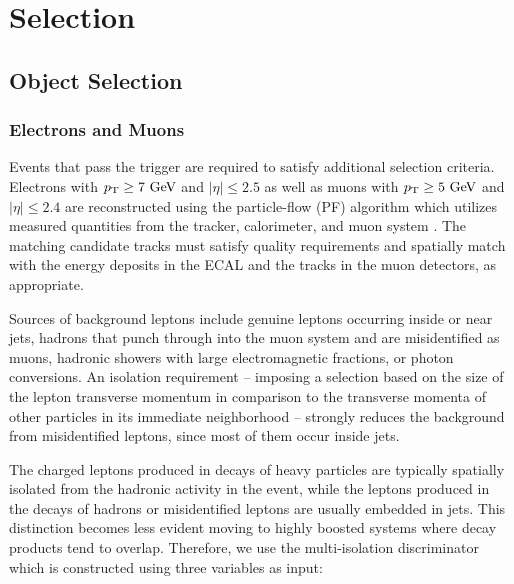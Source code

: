 \chapter{Selection}
\label{chap:Selection}

\section{Object Selection}
\label{sec:Selection/Object}

\subsection{Electrons and Muons}
Events that pass the trigger are required to satisfy additional selection criteria. Electrons with $p_{\mathrm{T}} \geq 7\,\,\text{Ge\hspace{-.08em}V}$ and $|\eta| \leq 2.5$ as well as muons with $p_{\mathrm{T}} \geq 5\,\,\text{Ge\hspace{-.08em}V}$ and $|\eta| \leq 2.4$ are reconstructed using the particle-flow (PF) algorithm which utilizes measured quantities from the tracker, calorimeter, and muon system \cite{CMS-PAS-PFT-09-001}. The matching candidate tracks must satisfy quality requirements and spatially match with the energy deposits in the ECAL and the tracks in the muon detectors, as appropriate.

Sources of background leptons include genuine leptons occurring inside or near jets, hadrons that punch through into the muon system and are misidentified as muons, hadronic showers with large electromagnetic fractions, or photon conversions. An isolation requirement -- imposing a selection based on the size of the lepton transverse momentum in comparison to the transverse momenta of other particles in its immediate neighborhood -- strongly reduces the background from misidentified leptons, since most of them occur inside jets.


The charged leptons produced in decays of heavy particles are typically spatially isolated from the hadronic activity in the event,
while the leptons produced in the decays of hadrons or misidentified leptons are usually
embedded in jets. This distinction becomes less evident moving to
highly boosted systems where decay products tend to overlap.
Therefore, we use the multi-isolation discriminator which is constructed using three variables as input:

